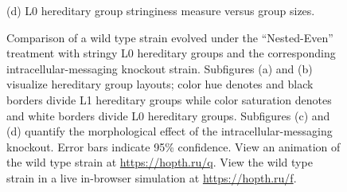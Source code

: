 \begin{figure}[!htbp]
\begin{center}
\begin{minipage}[t]{0.5\linewidth}
\hspace*{\fill}%
\begin{minipage}[t]{\columnwidth}
\centering
\vspace{0pt} %
\begin{minipage}[b]{\textwidth}
{(d) L0 hereditary group stringiness measure versus group sizes.}
\end{minipage}
\end{minipage}%
\hspace*{\fill}

\end{minipage}

\caption{
Comparison of a wild type strain evolved under the ``Nested-Even'' treatment with stringy L0 hereditary groups and the corresponding intracellular-messaging knockout strain.
Subfigures (a) and (b) visualize hereditary group layouts;
color hue denotes and black borders divide L1 hereditary groups while color saturation denotes and white borders divide L0 hereditary groups.
Subfigures (c) and (d) quantify the morphological effect of the intracellular-messaging knockout.
Error bars indicate 95\% confidence.
View an animation of the wild type strain at \url{https://hopth.ru/q}.
View the wild type strain in a live in-browser simulation at \url{https://hopth.ru/f}.
}
\label{fig:ko-morphology}
\end{center}
\end{figure}
